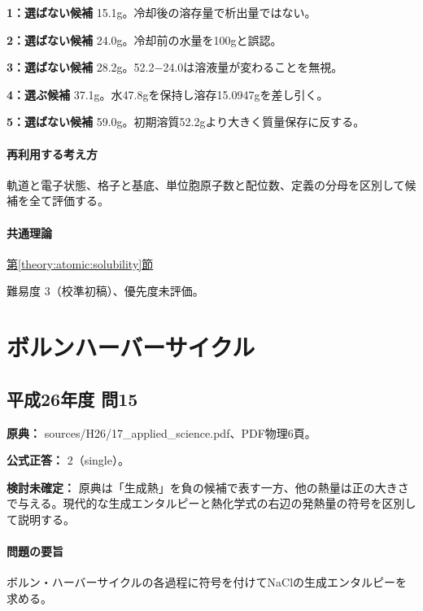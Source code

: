 \noindent\textbf{1：選ばない候補} 15.1g。冷却後の溶存量で析出量ではない。\par

\noindent\textbf{2：選ばない候補} 24.0g。冷却前の水量を100gと誤認。\par

\noindent\textbf{3：選ばない候補} 28.2g。52.2−24.0は溶液量が変わることを無視。\par

\noindent\textbf{4：選ぶ候補} 37.1g。水47.8gを保持し溶存15.0947gを差し引く。\par

\noindent\textbf{5：選ばない候補} 59.0g。初期溶質52.2gより大きく質量保存に反する。\par

\paragraph{再利用する考え方} 軌道と電子状態、格子と基底、単位胞原子数と配位数、定義の分母を区別して候補を全て評価する。

\paragraph{共通理論} \hyperref[theory:atomic:solubility]{第\ref*{theory:atomic:solubility}節}

\par 難易度 3（校準初稿）、優先度未評価。

\section{ボルンハーバーサイクル}

\subsection{平成26年度 問15}
\label{q:h26-reg-applied-15}

\noindent\textbf{原典：} sources/H26/17\_applied\_science.pdf、PDF物理6頁。

\textbf{公式正答：} 2（single）。

\par\textbf{検討未確定：} 原典は「生成熱」を負の候補で表す一方、他の熱量は正の大きさで与える。現代的な生成エンタルピーと熱化学式の右辺の発熱量の符号を区別して説明する。

\paragraph{問題の要旨} ボルン・ハーバーサイクルの各過程に符号を付けてNaClの生成エンタルピーを求める。


